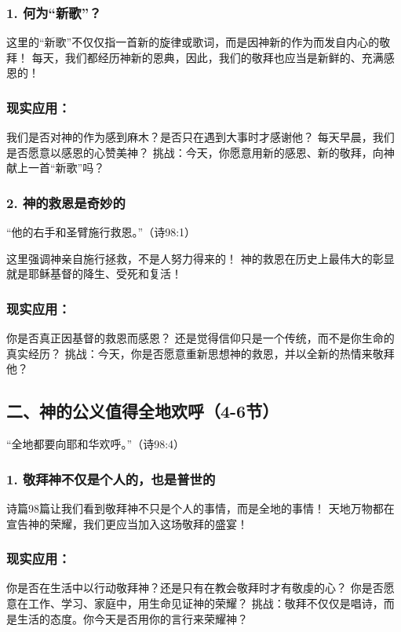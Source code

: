\documentclass[a4paper, 12pt]{article}
\begin{document}
\subsubsection*{1. 何为“新歌”？}
这里的“新歌”不仅仅指一首新的旋律或歌词，而是因神新的作为而发自内心的敬拜！
每天，我们都经历神新的恩典，因此，我们的敬拜也应当是新鲜的、充满感恩的！
\subsubsection*{现实应用：}

我们是否对神的作为感到麻木？是否只在遇到大事时才感谢他？
每天早晨，我们是否愿意以感恩的心赞美神？
挑战：今天，你愿意用新的感恩、新的敬拜，向神献上一首“新歌”吗？

\subsubsection*{2. 神的救恩是奇妙的}
“他的右手和圣臂施行救恩。”（诗98:1）

这里强调神亲自施行拯救，不是人努力得来的！
神的救恩在历史上最伟大的彰显就是耶稣基督的降生、受死和复活！
\subsubsection*{现实应用：}

你是否真正因基督的救恩而感恩？
还是觉得信仰只是一个传统，而不是你生命的真实经历？
挑战：今天，你是否愿意重新思想神的救恩，并以全新的热情来敬拜他？

\subsection*{二、神的公义值得全地欢呼（4-6节）}
“全地都要向耶和华欢呼。”（诗98:4）

\subsubsection*{1. 敬拜神不仅是个人的，也是普世的}
诗篇98篇让我们看到敬拜神不只是个人的事情，而是全地的事情！
天地万物都在宣告神的荣耀，我们更应当加入这场敬拜的盛宴！
\subsubsection*{现实应用：}

你是否在生活中以行动敬拜神？还是只有在教会敬拜时才有敬虔的心？
你是否愿意在工作、学习、家庭中，用生命见证神的荣耀？
挑战：敬拜不仅仅是唱诗，而是生活的态度。你今天是否用你的言行来荣耀神？
\end{document}

